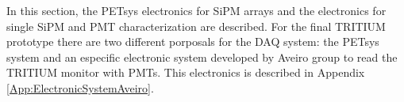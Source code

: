 In this section, the PETsys electronics for SiPM arrays and the electronics for single SiPM and PMT characterization are described. For the final TRITIUM prototype there are two different porposals for the DAQ system: the PETsys system and an especific electronic system developed by Aveiro group to read the TRITIUM monitor with PMTs. This electronics is described in Appendix \ref{App:ElectronicSystemAveiro}.


 